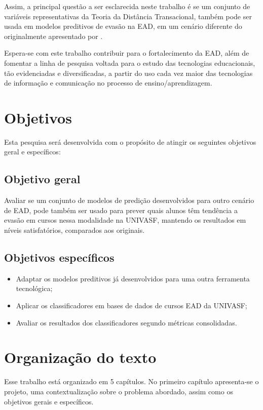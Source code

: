 Assim, a principal questão a ser esclarecida neste trabalho é se um conjunto de variáveis
representativas da Teoria da Distância Transacional, também pode ser usada em modelos preditivos
de evasão na EAD, em um cenário diferente do originalmente apresentado por .

Espera-se com este trabalho contribuir para o fortalecimento da EAD, além de
fomentar a linha de pesquisa voltada para o estudo das tecnologias educacionais,
tão evidenciadas e diversificadas, a partir do uso cada vez maior das
tecnologias de informação e comunicação no processo de ensino/aprendizagem.

\section{Objetivos}

Esta pesquisa será desenvolvida com o propósito de atingir os seguintes
objetivos geral e específicos:

\subsection{Objetivo geral}

Avaliar se um conjunto de modelos de predição desenvolvidos para outro cenário
de EAD, pode também ser usado para prever quais alunos têm tendência a evasão em
cursos nessa modalidade na UNIVASF, mantendo os resultados em níveis
satisfatórios, comparados aos originais.

\subsection{Objetivos específicos}
\begin{itemize}
  \item Adaptar os modelos preditivos já desenvolvidos para uma outra ferramenta
  tecnológica;
  \item Aplicar os classificadores em bases de dados de cursos EAD da UNIVASF;
  \item Avaliar os resultados dos classificadores segundo métricas consolidadas.
\end{itemize}

\section{Organização do texto}

Esse trabalho está organizado em 5 capítulos. No primeiro capítulo apresenta-se
o projeto, uma contextualização sobre o problema abordado, assim como os
objetivos gerais e específicos.

